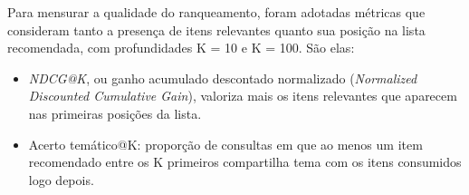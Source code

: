\documentclass[a4paper,12pt]{article}
\begin{document}
{%





Para mensurar a qualidade do ranqueamento, foram adotadas métricas que consideram tanto a presença de itens relevantes quanto sua posição na lista recomendada, com profundidades K = 10 e K = 100. São elas:

\begin{itemize}
    \item[a)] \textit{NDCG@K}, ou ganho acumulado descontado normalizado (\textit{Normalized Discounted Cumulative Gain}), valoriza mais os itens relevantes que aparecem nas primeiras posições da lista.
    \item[b)] Acerto temático@K: proporção de consultas em que ao menos um item recomendado entre os K primeiros compartilha tema com os itens consumidos logo depois.
\end{itemize}


}
\end{document}
